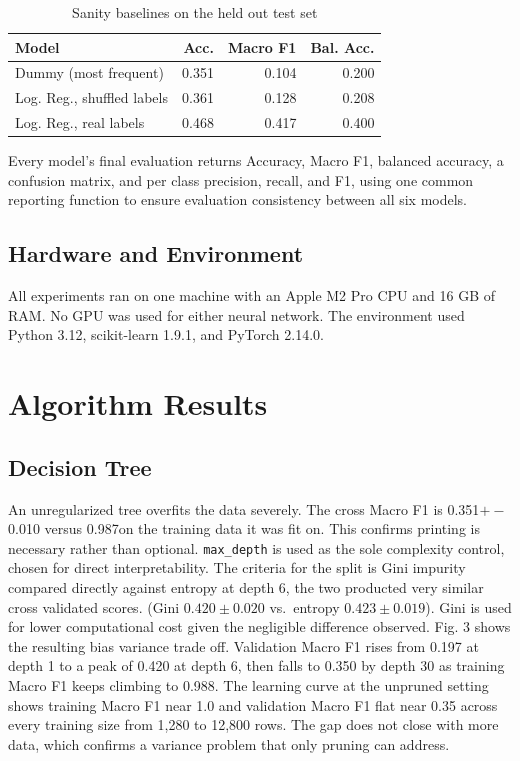 \documentclass[conference]{IEEEtran}
\begin{document}
\begin{table}[htbp]
\caption{Sanity baselines on the held out test set}
\label{tab:baselines}
\centering
\small
\begin{tabular}{lrrr}
\toprule
\textbf{Model} & \textbf{Acc.} & \textbf{Macro F1} & \textbf{Bal. Acc.} \\
\midrule
Dummy (most frequent) & 0.351 & 0.104 & 0.200 \\
Log. Reg., shuffled labels & 0.361 & 0.128 & 0.208 \\
Log. Reg., real labels & 0.468 & 0.417 & 0.400 \\
\bottomrule
\end{tabular}
\end{table}

Every model's final evaluation returns Accuracy, Macro F1, balanced accuracy, a confusion matrix, and per class precision, recall, and F1, using one common reporting function to ensure evaluation consistency between all six models.

\subsection{Hardware and Environment}
All experiments ran on one machine with an Apple M2 Pro CPU and 16 GB of RAM. No GPU was used for either neural network. The environment used Python 3.12, scikit-learn 1.9.1, and PyTorch 2.14.0.

\section{Algorithm Results}

\subsection{Decision Tree}
An unregularized tree overfits the data severely. The cross Macro F1 is 0.351$ +-$ 0.010 versus 0.987on the training data it was fit on. This confirms printing is necessary rather than optional. \texttt{max\_depth} is used as the sole complexity control, chosen for direct interpretability. The criteria for the split is Gini impurity compared directly against entropy at depth 6, the two producted very similar cross validated scores. (Gini $0.420 \pm 0.020$ vs.\ entropy $0.423 \pm 0.019$). Gini is used for lower computational cost given the negligible difference observed. Fig. 3 shows the resulting bias variance trade off. Validation Macro F1 rises from 0.197 at depth 1 to a peak of 0.420 at depth 6, then falls to 0.350 by depth 30 as training Macro F1 keeps climbing to 0.988. The learning curve at the unpruned setting shows training Macro F1 near 1.0 and validation Macro F1 flat near 0.35 across every training size from 1,280 to 12,800 rows. The gap does not close with more data, which confirms a variance problem that only pruning can address. 
\end{document}
